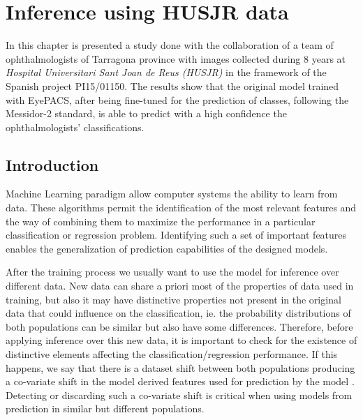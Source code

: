 
\chapter{Inference using HUSJR data} %

\label{Chapter:Inference} %

In this chapter is presented a study done with the collaboration of a team of ophthalmologists of Tarragona province with images collected during 8 years at \emph{Hospital Universitari Sant Joan de Reus (HUSJR)} in the framework of the Spanish project PI15/01150. The results show that the original model trained with EyePACS, after being fine-tuned for the prediction of classes, following the Messidor-2 standard, is able to predict with a high confidence the ophthalmologists' classifications.


\section{Introduction}

Machine Learning paradigm allow computer systems the ability to learn from data. These algorithms permit the identification of the most relevant features and the way of combining them to maximize the performance in a particular classification or regression problem. Identifying such a set of important features enables the generalization of prediction capabilities of the designed models. %


After the training process we usually want to use the model for inference over different data. New data can share a priori most of the properties of data used in training, but also it may have distinctive properties not present in the original data that could influence on the classification, ie. the probability distributions of both populations can be similar but also have some differences. Therefore, before applying inference over this new data, it is important to check for the existence of distinctive elements affecting the classification/regression performance. If this happens, we say that there is a dataset shift between both populations producing a co-variate shift in the model derived features used for prediction by the model \citep{sugiyama2017dataset}. Detecting or discarding such a co-variate shift is critical when using models from prediction in similar but different populations.

